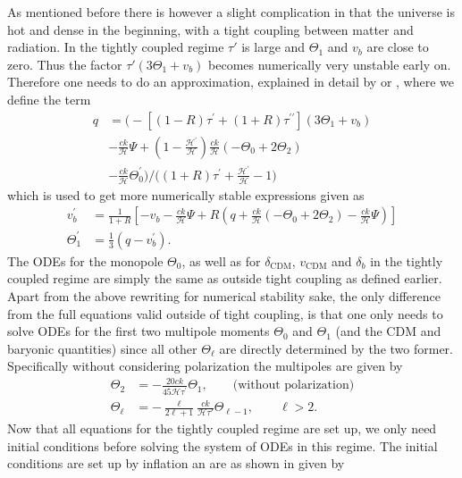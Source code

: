 \documentclass[twocolumn]{aastex62}
\begin{document}
As mentioned before there is however a slight complication in that the universe is hot and dense in the beginning, with a tight coupling between matter and radiation. In the tightly coupled regime $\tau'$ is large and $\Theta_1$ and $v_b$ are close to zero. Thus the factor $\tau' (3\Theta_1 + v_b)$ becomes numerically very unstable early on. Therefore one needs to do an approximation, explained in detail by \cite{callin:2006} or \cite{winther:2020b}, where we define the term 
\begin{align}
q &= \bigr(-[(1-R)\tau^\prime + (1+R)\tau^{\prime\prime}](3\Theta_1+v_b) \\&-
            \frac{ck}{\mathcal{H}}\Psi + (1-\frac{\mathcal{H}^\prime}{\mathcal{H}})\frac{ck}{\mathcal{H}}(-\Theta_0 +
            2\Theta_2) \\ &- \frac{ck}{\mathcal{H}}\Theta_0^\prime\bigr)/\bigl((1+R)\tau^\prime + \frac{\mathcal{H}^\prime}{\mathcal{H}} -
            1\bigr)
\end{align}
which is used to get more numerically stable expressions given as 
\begin{align}
    v_b^\prime &= \frac{1}{1+R} \left[-v_b - \frac{ck}{\mathcal{H}}\Psi + R(q +
    \frac{ck}{\mathcal{H}}(-\Theta_0 + 2\Theta_2) - \frac{ck}{\mathcal{H}}\Psi)\right]\\
    \Theta^\prime_1 &= \frac{1}{3} (q - v_b^\prime).
\end{align}
The ODEs for the monopole $\Theta_0$, as well as for $\delta_\mathrm{CDM}$, $v_\mathrm{CDM}$ and $\delta_b$ in the tightly coupled regime are simply the same as outside tight coupling as defined earlier.
Apart from the above rewriting for numerical stability sake, the only difference from the full equations valid outside of tight coupling, is that one only needs to solve ODEs for the first two multipole moments $\Theta_0$ and $\Theta_1$ (and the CDM and baryonic quantities) since all other $\Theta_\ell$ are directly determined by the two former. Specifically without considering polarization the multipoles are given by
\begin{align}
    \Theta_2 &= 
    -\frac{20ck}{45\mathcal{H}\tau^\prime} \Theta_1, \quad\quad \textrm{(without polarization)}\\ 
    \Theta_\ell &= -\frac{\ell}{2\ell+1} \frac{ck}{\mathcal{H}\tau'} \Theta_{\ell-1}, \quad\quad \ell > 2.
\end{align}
Now that all equations for the tightly coupled regime are set up, we only need initial conditions before solving the system of ODEs in this regime. The initial conditions are set up by inflation an are as shown in \cite{winther:2020b} given by 
\end{document}
